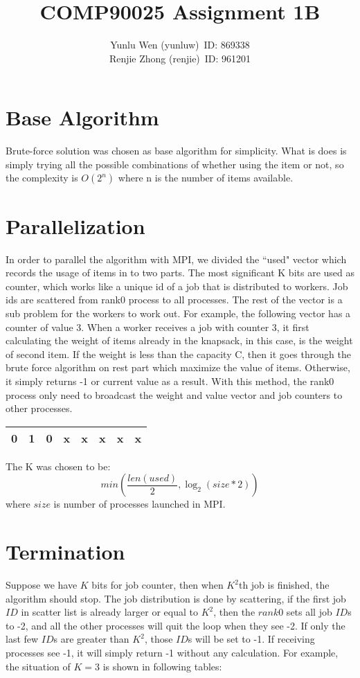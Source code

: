 \documentclass[12pt, a4paper, twocolumn]{article}
\title{COMP90025 Assignment 1B}
\author{Yunlu Wen (yunluw)\ ID: 869338\\ Renjie Zhong (renjie)\ ID: 961201}
\begin{document}
    \maketitle

    \section{Base Algorithm}
    Brute-force solution was chosen as base algorithm for simplicity. What is does is simply trying all the possible combinations of whether using the item or not, so the complexity is $O(2^n)$ where n is the number of items available.

    \section{Parallelization}
    In order to parallel the algorithm with MPI, we divided the ``used" vector which records the usage of items in to two parts. The most significant K bits are used as counter, which works like a unique id of a job that is distributed to workers. Job ids are scattered from rank0 process to all processes. The rest of the vector is a sub problem for the workers to work out. For example, the following vector has a counter of value 3. When a worker receives a job with counter 3, it first calculating the weight of items already in the knapsack, in this case, is the weight of second item. If the weight is less than the capacity C, then it goes through the brute force algorithm on rest part which maximize the value of items. Otherwise, it simply returns -1 or current value as a result. With this method, the rank0 process only need to broadcast the weight and value vector and job counters to other processes.

    \begin{table}[h]
        \centering
        \begin{tabular}{|c|c|c|c|c|c|c|c|}
            \hline
            0 & 1 & 0 & x & x & x & x & x\\
            \hline
        \end{tabular}
    \end{table}

    The K was chosen to be: 
    $$min(\frac{len(used)}{2}, \log_2(size*2))$$
    where $size$ is number of processes launched in MPI.

    \section{Termination}
    Suppose we have $K$ bits for job counter, then when $K^2$th job is finished, the algorithm should stop. The job distribution is done by scattering, if the first job $ID$ in scatter list is already larger or equal to $K^2$, then the $rank0$ sets all job $ID$s to -2, and all the other processes will quit the loop when they see -2. If only the last few $ID$s are greater than $K^2$, those $ID$s will be set to -1. If receiving processes see -1, it will simply return -1 without any calculation. For example, the situation of $K=3$ is shown in following tables:
\end{document}
